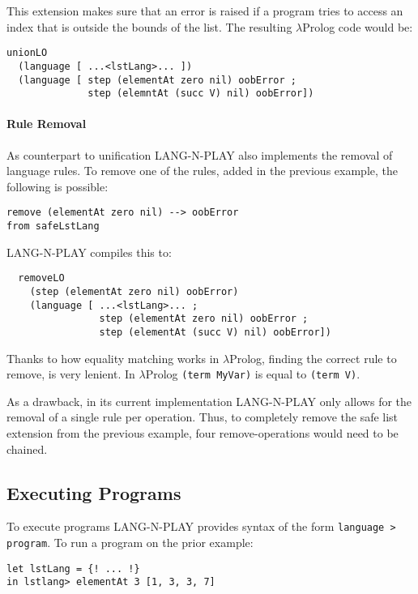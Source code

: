 This extension makes sure that an error is raised if a program tries to access an index that is outside the bounds of the list. The resulting $\lambda$Prolog code would be:

\begin{lstlisting}
unionLO
  (language [ ...<lstLang>... ])
  (language [ step (elementAt zero nil) oobError ;
              step (elemntAt (succ V) nil) oobError])
\end{lstlisting}

\paragraph{Rule Removal}
As counterpart to unification LANG-N-PLAY also implements the removal of language rules. To remove one of the rules, added in the previous example, the following is possible:

\begin{lstlisting}
remove (elementAt zero nil) --> oobError
from safeLstLang 
\end{lstlisting}

LANG-N-PLAY compiles this to:

\begin{lstlisting}
  removeLO
    (step (elementAt zero nil) oobError)
    (language [ ...<lstLang>... ;
                step (elementAt zero nil) oobError ;
                step (elementAt (succ V) nil) oobError])
\end{lstlisting}

Thanks to how equality matching works in $\lambda$Prolog, finding the correct rule to remove, is very lenient. In $\lambda$Prolog \lstinline|(term MyVar)| is equal to \lstinline|(term V)|.

As a drawback, in its current implementation LANG-N-PLAY only allows for the removal of a single rule per operation. Thus, to completely remove the safe list extension from the previous example, four remove-operations would need to be chained.


\subsection{Executing Programs}
To execute programs LANG-N-PLAY provides syntax of the form \lstinline|language > program|. To run a program on the prior example:

\begin{lstlisting}
let lstLang = {! ... !}
in lstlang> elementAt 3 [1, 3, 3, 7]
\end{lstlisting}


